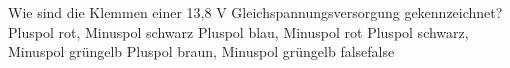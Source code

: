     {Wie sind die Klemmen einer 13,8 V Gleichspannungsversorgung gekennzeichnet?}
    {Pluspol rot, Minuspol schwarz}
    {Pluspol blau, Minuspol rot}
    {Pluspol schwarz, Minuspol grüngelb}
    {Pluspol braun, Minuspol grüngelb}
    {false}{false}